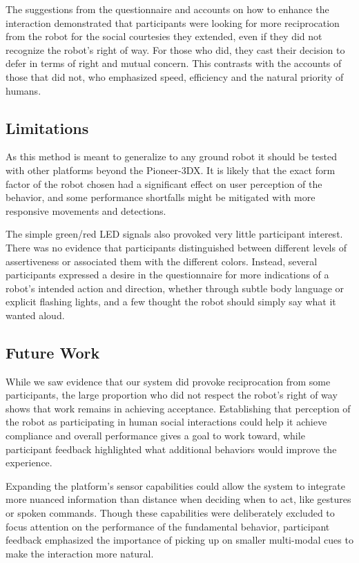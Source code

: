 \documentclass[letterpaper, 10 pt, conference]{ieeeconf}  %
\begin{document}
The suggestions from the questionnaire and accounts on how to enhance the interaction demonstrated that participants were looking for more reciprocation from the robot for the social courtesies they extended, even if they did not recognize the robot's right of way. For those who did, they cast their decision to defer in terms of right and mutual concern. This contrasts with the accounts of those that did not, who emphasized speed, efficiency and the natural priority of humans. 

\subsection{Limitations}

As this method is meant to generalize to any ground robot it should be tested with other platforms beyond the Pioneer-3DX. It is likely that the exact form factor of the robot chosen had a significant effect on user perception of the behavior, and some performance shortfalls might be mitigated with more responsive movements and detections. 

The simple green/red LED signals also provoked very little participant interest. There was no evidence that participants distinguished between different levels of assertiveness or associated them with the different colors. Instead, several participants expressed a desire in the questionnaire for more indications of a robot’s intended action and direction, whether through subtle body language or explicit flashing lights, and a few thought the robot should simply say what it wanted aloud. 

\subsection{Future Work}

While we saw evidence that our system did provoke reciprocation from some participants, the large proportion who did not respect the robot's right of way shows that work remains in achieving acceptance. Establishing that perception of the robot as participating in human social interactions could help it achieve compliance and overall performance gives a goal to work toward, while participant feedback highlighted what additional behaviors would improve the experience.

Expanding the platform’s sensor capabilities could allow the system to integrate more nuanced information than distance when deciding when to act, like gestures or spoken commands. Though these capabilities were deliberately excluded to focus attention on the performance of the fundamental behavior, participant feedback emphasized the importance of picking up on smaller multi-modal cues to make the interaction more natural.
\end{document}
